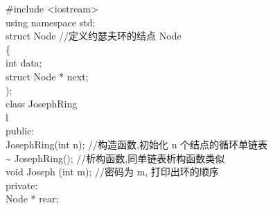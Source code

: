 \documentclass[10pt]{article}
\begin{document}
\#include <iostream>\\
using namespace std;\\
struct Node //定义约瑟夫环的结点 Node\\
\{\\
int data;\\
struct Node * next;\\
);\\
class JosephRing\\
l\\
public:\\
JosephRing(int n); //构造函数,初始化 n 个结点的循环单链表\\
\~{} JosephRing(); //析构函数,同单链表析构函数类似\\
void Joseph (int m); //密码为 m, 打印出环的顺序\\
private:\\
Node * rear;

\begin{verbatim}

\end{verbatim}
\end{document}
